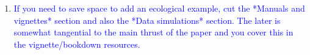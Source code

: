 \documentclass[12pt,letterpaper]{article}
\begin{document}
\begin{enumerate}
\item{\textcolor{blue}{If you need to save space to add an ecological example, cut the *Manuals and vignettes* section and also the *Data simulations* section. The later is somewhat tangential to the main thrust of the paper and you cover this in the vignette/bookdown resources.}}

\end{enumerate}
\end{document}

